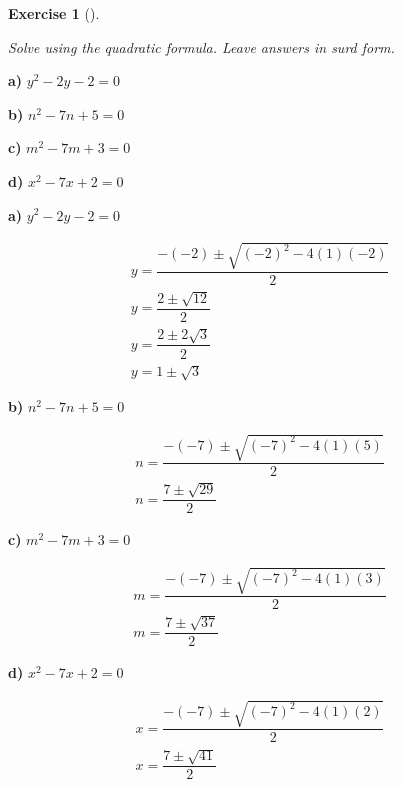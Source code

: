 \documentclass[
  letterpaper,
  DIV=11,
  numbers=noendperiod]{scrreprt}
\theoremstyle{definition}
\newtheorem{exercise}{Exercise}[chapter]
\theoremstyle{remark}
\begin{document}
\begin{exercise}[]\protect\hypertarget{exr-u6-12}{}\label{exr-u6-12}

\emph{Solve using the quadratic formula. Leave answers in surd form.}

\textbf{a)} \(\displaystyle y^2 - 2y - 2 = 0\)

\textbf{b)} \(\displaystyle n^2 - 7n + 5 = 0\)

\textbf{c)} \(\displaystyle m^2 - 7m + 3 = 0\)

\textbf{d)} \(\displaystyle x^2 - 7x + 2 = 0\)

\begin{tcolorbox}[enhanced jigsaw, opacitybacktitle=0.6, coltitle=black, arc=.35mm, colframe=quarto-callout-tip-color-frame, colback=white, bottomrule=.15mm, left=2mm, colbacktitle=quarto-callout-tip-color!10!white, titlerule=0mm, opacityback=0, title=\textcolor{quarto-callout-tip-color}{\faLightbulb}\hspace{0.5em}{🔍 View Solutions}, leftrule=.75mm, breakable, rightrule=.15mm, bottomtitle=1mm, toptitle=1mm, toprule=.15mm]

\textbf{a)} \(\displaystyle y^2 - 2y - 2 = 0\)

\begin{align*}
y = \dfrac{-(-2) \pm \sqrt{(-2)^2 - 4(1)(-2)}}{2} \\ y = \dfrac{2 \pm \sqrt{12}}{2} \\ y = \dfrac{2 \pm 2\sqrt{3}}{2} \\ y = 1 \pm \sqrt{3}
\end{align*}

\textbf{b)} \(\displaystyle n^2 - 7n + 5 = 0\)

\begin{align*}
n = \dfrac{-(-7) \pm \sqrt{(-7)^2 - 4(1)(5)}}{2} \\ n = \dfrac{7 \pm \sqrt{29}}{2}
\end{align*}

\textbf{c)} \(\displaystyle m^2 - 7m + 3 = 0\)

\begin{align*}
m = \dfrac{-(-7) \pm \sqrt{(-7)^2 - 4(1)(3)}}{2} \\ m = \dfrac{7 \pm \sqrt{37}}{2}
\end{align*}

\textbf{d)} \(\displaystyle x^2 - 7x + 2 = 0\)

\begin{align*}
x = \dfrac{-(-7) \pm \sqrt{(-7)^2 - 4(1)(2)}}{2} \\ x = \dfrac{7 \pm \sqrt{41}}{2}
\end{align*}

\end{tcolorbox}

\end{exercise}
\end{document}
